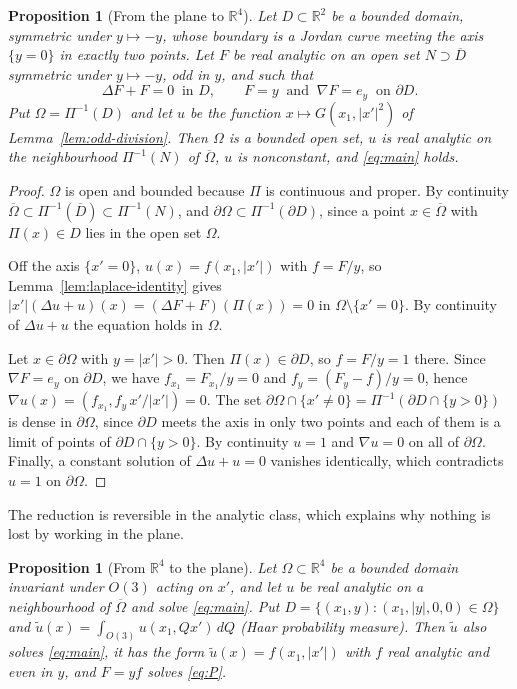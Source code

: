 \documentclass[11pt]{amsart}
\newtheorem{proposition}[theorem]{Proposition}
\theoremstyle{definition}
\theoremstyle{remark}
\numberwithin{equation}{section}
\newcommand{\R}{\mathbb{R}}
\begin{document}
\begin{proposition}[From the plane to $\R^4$]\label{prop:rotation}
Let $D\subset\R^2$ be a bounded domain, symmetric under $y\mapsto-y$, whose boundary is a Jordan curve meeting the axis $\{y=0\}$ in exactly two points. Let $F$ be real analytic on an open set $N\supset\overline D$ symmetric under $y\mapsto-y$, odd in $y$, and such that
\begin{equation}\label{eq:P}
\Delta F+F=0\ \text{ in }D,\qquad F=y\ \text{ and }\ \nabla F=e_y\ \text{ on }\partial D .
\end{equation}
Put $\Omega=\Pi^{-1}(D)$ and let $u$ be the function $x\mapsto G(x_1,|x'|^2)$ of Lemma~\ref{lem:odd-division}. Then $\Omega$ is a bounded open set, $u$ is real analytic on the neighbourhood $\Pi^{-1}(N)$ of $\overline\Omega$, $u$ is nonconstant, and \eqref{eq:main} holds.
\end{proposition}

\begin{proof}
$\Omega$ is open and bounded because $\Pi$ is continuous and proper. By continuity $\overline\Omega\subset\Pi^{-1}(\overline D)\subset\Pi^{-1}(N)$, and $\partial\Omega\subset\Pi^{-1}(\partial D)$, since a point $x\in\overline\Omega$ with $\Pi(x)\in D$ lies in the open set $\Omega$.

Off the axis $\{x'=0\}$, $u(x)=f(x_1,|x'|)$ with $f=F/y$, so Lemma~\ref{lem:laplace-identity} gives $|x'|(\Delta u+u)(x)=(\Delta F+F)(\Pi(x))=0$ in $\Omega\setminus\{x'=0\}$. By continuity of $\Delta u+u$ the equation holds in $\Omega$.

Let $x\in\partial\Omega$ with $y=|x'|>0$. Then $\Pi(x)\in\partial D$, so $f=F/y=1$ there. Since $\nabla F=e_y$ on $\partial D$, we have $f_{x_1}=F_{x_1}/y=0$ and $f_y=(F_y-f)/y=0$, hence $\nabla u(x)=(f_{x_1},f_y\,x'/|x'|)=0$. The set $\partial\Omega\cap\{x'\neq0\}=\Pi^{-1}(\partial D\cap\{y>0\})$ is dense in $\partial\Omega$, since $\partial D$ meets the axis in only two points and each of them is a limit of points of $\partial D\cap\{y>0\}$. By continuity $u=1$ and $\nabla u=0$ on all of $\partial\Omega$. Finally, a constant solution of $\Delta u+u=0$ vanishes identically, which contradicts $u=1$ on $\partial\Omega$.
\end{proof}

The reduction is reversible in the analytic class, which explains why nothing is lost by working in the plane.

\begin{proposition}[From $\R^4$ to the plane]\label{prop:converse}
Let $\Omega\subset\R^4$ be a bounded domain invariant under $O(3)$ acting on $x'$, and let $u$ be real analytic on a neighbourhood of $\overline\Omega$ and solve \eqref{eq:main}. Put $D=\{(x_1,y):(x_1,|y|,0,0)\in\Omega\}$ and $\tilde u(x)=\int_{O(3)}u(x_1,Qx')\,dQ$ \textup{(}Haar probability measure\textup{)}. Then $\tilde u$ also solves \eqref{eq:main}, it has the form $\tilde u(x)=f(x_1,|x'|)$ with $f$ real analytic and even in $y$, and $F=yf$ solves \eqref{eq:P}.
\end{proposition}
\end{document}

